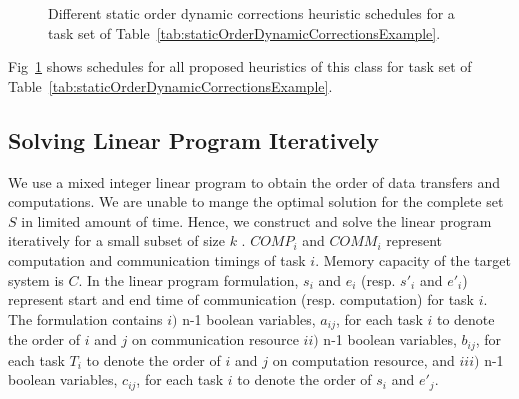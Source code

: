 \documentclass[runningheads]{llncs} %
\begin{document}
\begin{figure}[htb]
	\caption{ \label{fig:staticOrderDynamicCorrectionsExample} Different static order dynamic corrections heuristic schedules for a task set of Table~\ref{tab:staticOrderDynamicCorrectionsExample}.}
\end{figure} 



Fig~\ref{fig:staticOrderDynamicCorrectionsExample} shows schedules for all proposed heuristics of this class for task set of Table~\ref{tab:staticOrderDynamicCorrectionsExample}.




\subsection{Solving Linear Program Iteratively}
\label{subsec:linearprogrammingformulation}
We use a mixed integer linear program  to obtain the order of data transfers and computations. We are unable to mange the optimal solution for the complete set $S$ in limited amount of time.  Hence, we construct and solve the linear program iteratively for a small subset of size $k$ . $COMP_i$ and $COMM_i$ represent computation and communication timings of task $i$. Memory capacity of the  target system is $C$. In the linear program formulation, $s_i$ and $e_i$ (resp. $s'_i$ and $e'_i$) represent start and end time of communication (resp. computation) for task $i$. The formulation contains $i)$ n-1 boolean variables, $a_{ij}$, for each task $i$ to denote the order of $i$ and $j$  on communication resource   $ii)$ n-1 boolean variables, $b_{ij}$, for each task $T_i$ to denote the order of $i$ and $j$  on computation resource, and $iii)$ n-1 boolean variables, $c_{ij}$, for each task $i$ to denote the order of $s_i$ and $e'_j$.


\end{document}
